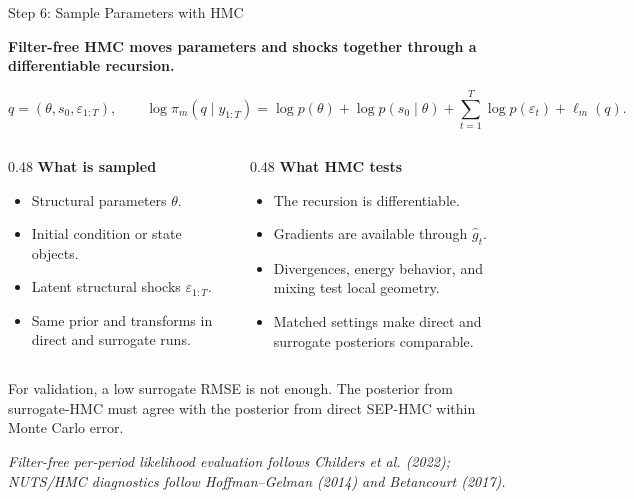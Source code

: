 \documentclass[aspectratio=169,10pt]{beamer}
\newcommand{\eps}{\varepsilon}
\newcommand{\state}{s}
\newcommand{\obs}{y}
\newcommand{\smallnote}[1]{%
  \vspace{0.25em}
  \begin{center}
  \parbox{0.92\linewidth}{\centering\footnotesize #1}
  \end{center}
}
\newcommand{\sourcefoot}[1]{%
  \vspace{-0.55em}
  \begin{flushleft}
  \parbox{0.96\linewidth}{\raggedright\tiny\textit{#1}}
  \end{flushleft}
}
\newcommand{\claim}[1]{%
  \begin{center}
  \parbox{0.94\linewidth}{\centering\large\bfseries #1}
  \end{center}
}
\begin{document}
\begin{frame}{Step 6: Sample Parameters with HMC}
\claim{Filter-free HMC moves parameters and shocks together through a differentiable recursion.}

\vspace{0.05em}
\[
  q=(\theta,\state_0,\eps_{1:T}),\qquad
  \log \pi_m(q\mid \obs_{1:T})
  =
  \log p(\theta)+\log p(\state_0\mid\theta)
  +\sum_{t=1}^{T}\log p(\eps_t)+\ell_m(q).
\]

\vspace{-0.35em}
\begin{columns}[T,onlytextwidth]
\begin{column}{0.48\textwidth}
\textbf{What is sampled}
\begin{itemize}
  \item Structural parameters \(\theta\).
  \item Initial condition or state objects.
  \item Latent structural shocks \(\eps_{1:T}\).
  \item Same prior and transforms in direct and surrogate runs.
\end{itemize}
\end{column}
\begin{column}{0.48\textwidth}
\textbf{What HMC tests}
\begin{itemize}
  \item The recursion is differentiable.
  \item Gradients are available through \(\widehat g_t\).
  \item Divergences, energy behavior, and mixing test local geometry.
  \item Matched settings make direct and surrogate posteriors comparable.
\end{itemize}
\end{column}
\end{columns}

\smallnote{For validation, a low surrogate RMSE is not enough. The posterior from surrogate-HMC must agree with the posterior from direct SEP-HMC within Monte Carlo error.}
\sourcefoot{Filter-free per-period likelihood evaluation follows Childers et al. (2022); NUTS/HMC diagnostics follow Hoffman--Gelman (2014) and Betancourt (2017).}
\end{frame}
\end{document}
